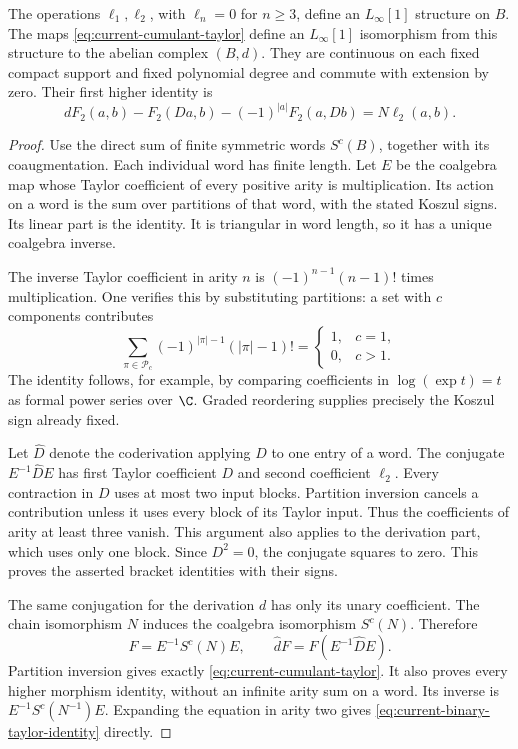 \begin{theorem}
\label{thm:current-supported-taylor}
The operations $\ell_1,\ell_2$, with $\ell_n=0$ for $n\ge3$,
define an $L_\infty[1]$ structure on $B$.
The maps \eqref{eq:current-cumulant-taylor} define an
$L_\infty[1]$ isomorphism from this structure to the abelian
complex $(B,d)$.  They are continuous on each fixed compact support
and fixed polynomial degree and commute with extension by zero.
Their first higher identity is
\begin{equation}
\label{eq:current-binary-taylor-identity}
 dF_2(a,b)-F_2(Da,b)-(-1)^{|a|}F_2(a,Db)
                 =N\ell_2(a,b).
\end{equation}
\end{theorem}
\begin{proof}
Use the direct sum of finite symmetric words $S^c(B)$, together
with its coaugmentation.  Each individual word has finite length.
Let $E$ be the coalgebra map whose Taylor coefficient of every
positive arity is multiplication.  Its action on a word is the sum
over partitions of that word, with the stated Koszul signs.
Its linear part is the identity.  It is triangular in word length,
so it has a unique coalgebra inverse.

The inverse Taylor coefficient in arity $n$ is
$(-1)^{n-1}(n-1)!$ times multiplication.  One verifies this by
substituting partitions: a set with $c$ components contributes
\[
 \sum_{\pi\in\mathcal P_c}(-1)^{|\pi|-1}(|\pi|-1)!
 =\begin{cases}1,&c=1,\\0,&c>1.\end{cases}
\]
The identity follows, for example, by comparing coefficients in
$\log(\exp t)=t$ as formal power series over $\C$.
Graded reordering supplies precisely the Koszul sign already fixed.

Let $\widehat D$ denote the coderivation applying $D$ to one
entry of a word.  The conjugate $E^{-1}\widehat D E$ has first
Taylor coefficient $D$ and second coefficient $\ell_2$.
Every contraction in $D$ uses at most two input blocks.
Partition inversion cancels a contribution unless it uses every
block of its Taylor input.  Thus the coefficients of arity at least
three vanish.  This argument also applies to the derivation part,
which uses only one block.  Since $D^2=0$, the conjugate squares to zero.
This proves the asserted bracket identities with their signs.

The same conjugation for the derivation $d$ has only its unary
coefficient.  The chain isomorphism $N$ induces the coalgebra
isomorphism $S^c(N)$.  Therefore
\[
 F=E^{-1}S^c(N)E,\qquad
 \widehat d F=F(E^{-1}\widehat D E).
\]
Partition inversion gives exactly
\eqref{eq:current-cumulant-taylor}.  It also proves every higher
morphism identity, without an infinite arity sum on a word.
Its inverse is $E^{-1}S^c(N^{-1})E$.
Expanding the equation in arity two gives
\eqref{eq:current-binary-taylor-identity} directly.


\end{proof}
